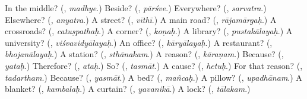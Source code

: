 \begin{tcolorbox}[breakable,colback=teal!4,colframe=teal!35!black,title={Before you move on}]
In the middle? (\textbf{}, \emph{madhye}.) Beside? (\textbf{}, \emph{pārśve}.) Everywhere? (\textbf{}, \emph{sarvatra}.) Elsewhere? (\textbf{}, \emph{anyatra}.) A street? (\textbf{}, \emph{vīthī}.) A main road? (\textbf{}, \emph{rājamārgaḥ}.) A crossroads? (\textbf{}, \emph{catuṣpathaḥ}.) A corner? (\textbf{}, \emph{koṇaḥ}.) A library? (\textbf{}, \emph{pustakālayaḥ}.) A university? (\textbf{}, \emph{viśvavidyālayaḥ}.) An office? (\textbf{}, \emph{kāryālayaḥ}.) A restaurant? (\textbf{}, \emph{bhojanālayaḥ}.) A station? (\textbf{}, \emph{sthānakam}.) A reason? (\textbf{}, \emph{kāraṇam}.) Because? (\textbf{}, \emph{yataḥ}.) Therefore? (\textbf{}, \emph{ataḥ}.) So? (\textbf{}, \emph{tasmāt}.) A cause? (\textbf{}, \emph{hetuḥ}.) For that reason? (\textbf{}, \emph{tadartham}.) Because? (\textbf{}, \emph{yasmāt}.) A bed? (\textbf{}, \emph{mañcaḥ}.) A pillow? (\textbf{}, \emph{upadhānam}.) A blanket? (\textbf{}, \emph{kambalaḥ}.) A curtain? (\textbf{}, \emph{yavanikā}.) A lock? (\textbf{}, \emph{tālakam}.)
\end{tcolorbox}
